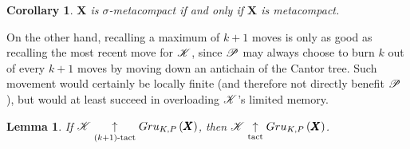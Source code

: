 \documentclass{amsart}
\newtheorem{lemma}[theorem]{Lemma}
\newtheorem{corollary}[theorem]{Corollary}
\theoremstyle{definition}
\begin{document}
\begin{corollary}
  $\pmb X$ is $\sigma$-metacompact if and only if $\pmb X$ is metacompact.
\end{corollary}

On the other hand, recalling a maximum of $k+1$ moves is only as good as
recalling the most recent move for $\mathscr{K}$, since $\mathscr{P}$ may always choose
to burn $k$ out of every $k+1$ moves
by moving down an antichain of the Cantor tree. Such movement would certainly
be locally finite (and therefore not directly benefit $\mathscr{P}$), but would
at least succeed in overloading $\mathscr{K}$'s limited memory.

\begin{lemma}
  If $\mathscr{K}\underset{(k+1)\text{-tact}}{\uparrow}Gru_{K,P}\left({\pmb X}\right)$, then
  $\mathscr{K}\underset{\text{tact}}{\uparrow}Gru_{K,P}\left({\pmb X}\right)$.
\end{lemma}
\end{document}
